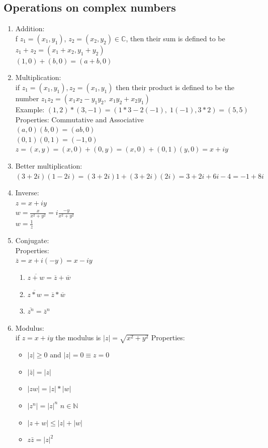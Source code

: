 \documentclass{article}
\begin{document}
\subsection{Operations on complex numbers}
\begin{enumerate}
	\item Addition:\\ f $z_1 = (x_1, y_1)$, $z_2 = (x_2, y_2) \in \mathbb{C}$, then their sum is defined to be $z_1 + z_2 = (x_1 + x_2, y_1 + y_2)$ \\
	$(1, 0)+(b, 0) = (a+b, 0)$
	\item Multiplication:\\ if $z_1 = (x_1, y_1), z_2 = (x_1, y_1)$ then their product is defined to be the number $z_1z_2=(x_1x_2 - y_1y_2,\; x_1y_2 + x_2y_1)$ \\
	Example: $(1,2)*(3, -1) = (1*3 - 2(-1), \; 1(-1), 3*2) = (5, 5)$ \\
	Properties: Commutative and Associative \\
	$(a, 0)(b, 0) = (ab, 0)$ \\
	$(0, 1)(0, 1) = (-1, 0)$\ \\
	$z = (x,y) = (x, 0) + (0, y) = (x, 0) + (0, 1)(y, 0) = x+iy$
	\item Better multiplication: \\
	$(3 + 2i)(1 - 2i) = (3+2i)1 + (3+2i)(2i) = 3+2i+6i-4=-1 + 8i$
	\item Inverse: \\
	$z = x+ iy$ \\
	$w = \frac{x}{x^2 + y^2} = i\frac{-y}{x^2 + y^2}$ \\ 
	$w = \frac{1}{z}$ 	
	\item Conjugate: \\
	Properties: \\
	$\overline{z} = x+i(-y) = x-iy$
	\begin{enumerate}
		\item $\overline{z+w} = \overline{z} + \overline{w}$
		\item $\overline{z*w} = \overline{z} * \overline{w}$
		\item $\overline{z^n} = \overline{z}^n$
	\end{enumerate}
	\pagebreak
	\item Modulus: \\
	if $z=x+iy$ the modulus is $|z|=\sqrt{x^2 + y^2}$
	Properties: \\
	\begin{itemize}
		\item $|z| \geq 0$ and $|z|=0 \equiv z=0$
		\item $|\bar{z}| = |z|$
		\item $|zw| = |z|*|w|$
		\item $|z^n| = |z|^n$   $n\in\mathbb{N}$
		\item $|z+w| \leq |z| + |w|$
		\item $z\bar{z} = |z|^2$
	\end{itemize}
\end{enumerate}
\end{document}
